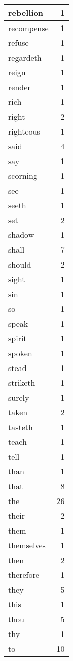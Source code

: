 \begin{center}
\begin{longtable}{l|r}
rebellion & 1 \\ \hline
recompense & 1 \\ \hline
refuse & 1 \\ \hline
regardeth & 1 \\ \hline
reign & 1 \\ \hline
render & 1 \\ \hline
rich & 1 \\ \hline
right & 2 \\ \hline
righteous & 1 \\ \hline
said & 4 \\ \hline
say & 1 \\ \hline
scorning & 1 \\ \hline
see & 1 \\ \hline
seeth & 1 \\ \hline
set & 2 \\ \hline
shadow & 1 \\ \hline
shall & 7 \\ \hline
should & 2 \\ \hline
sight & 1 \\ \hline
sin & 1 \\ \hline
so & 1 \\ \hline
speak & 1 \\ \hline
spirit & 1 \\ \hline
spoken & 1 \\ \hline
stead & 1 \\ \hline
striketh & 1 \\ \hline
surely & 1 \\ \hline
taken & 2 \\ \hline
tasteth & 1 \\ \hline
teach & 1 \\ \hline
tell & 1 \\ \hline
than & 1 \\ \hline
that & 8 \\ \hline
the & 26 \\ \hline
their & 2 \\ \hline
them & 1 \\ \hline
themselves & 1 \\ \hline
then & 2 \\ \hline
therefore & 1 \\ \hline
they & 5 \\ \hline
this & 1 \\ \hline
thou & 5 \\ \hline
thy & 1 \\ \hline
to & 10 \\ \hline

\end{longtable}
\end{center}
